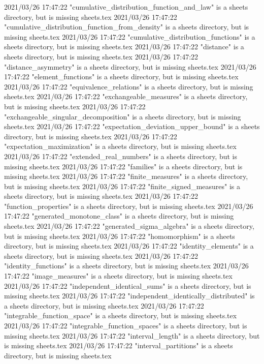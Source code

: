 2021/03/26 17:47:22 "cumulative_distribution_function_and_law" is a sheets directory, but is missing sheets.tex
2021/03/26 17:47:22 "cumulative_distribution_function_from_density" is a sheets directory, but is missing sheets.tex
2021/03/26 17:47:22 "cumulative_distribution_functions" is a sheets directory, but is missing sheets.tex
2021/03/26 17:47:22 "distance" is a sheets directory, but is missing sheets.tex
2021/03/26 17:47:22 "distance_asymmetry" is a sheets directory, but is missing sheets.tex
2021/03/26 17:47:22 "element_functions" is a sheets directory, but is missing sheets.tex
2021/03/26 17:47:22 "equivalence_relations" is a sheets directory, but is missing sheets.tex
2021/03/26 17:47:22 "exchangeable_measures" is a sheets directory, but is missing sheets.tex
2021/03/26 17:47:22 "exchangeable_singular_decomposition" is a sheets directory, but is missing sheets.tex
2021/03/26 17:47:22 "expectation_deviation_upper_bound" is a sheets directory, but is missing sheets.tex
2021/03/26 17:47:22 "expectation_maximization" is a sheets directory, but is missing sheets.tex
2021/03/26 17:47:22 "extended_real_numbers" is a sheets directory, but is missing sheets.tex
2021/03/26 17:47:22 "families" is a sheets directory, but is missing sheets.tex
2021/03/26 17:47:22 "finite_measures" is a sheets directory, but is missing sheets.tex
2021/03/26 17:47:22 "finite_signed_measures" is a sheets directory, but is missing sheets.tex
2021/03/26 17:47:22 "function_properties" is a sheets directory, but is missing sheets.tex
2021/03/26 17:47:22 "generated_monotone_class" is a sheets directory, but is missing sheets.tex
2021/03/26 17:47:22 "generated_sigma_algebra" is a sheets directory, but is missing sheets.tex
2021/03/26 17:47:22 "homomorphism" is a sheets directory, but is missing sheets.tex
2021/03/26 17:47:22 "identity_elements" is a sheets directory, but is missing sheets.tex
2021/03/26 17:47:22 "identity_functions" is a sheets directory, but is missing sheets.tex
2021/03/26 17:47:22 "image_measures" is a sheets directory, but is missing sheets.tex
2021/03/26 17:47:22 "independent_identical_sums" is a sheets directory, but is missing sheets.tex
2021/03/26 17:47:22 "independent_identically_distributed" is a sheets directory, but is missing sheets.tex
2021/03/26 17:47:22 "integrable_function_space" is a sheets directory, but is missing sheets.tex
2021/03/26 17:47:22 "integrable_function_spaces" is a sheets directory, but is missing sheets.tex
2021/03/26 17:47:22 "interval_length" is a sheets directory, but is missing sheets.tex
2021/03/26 17:47:22 "interval_partitions" is a sheets directory, but is missing sheets.tex
